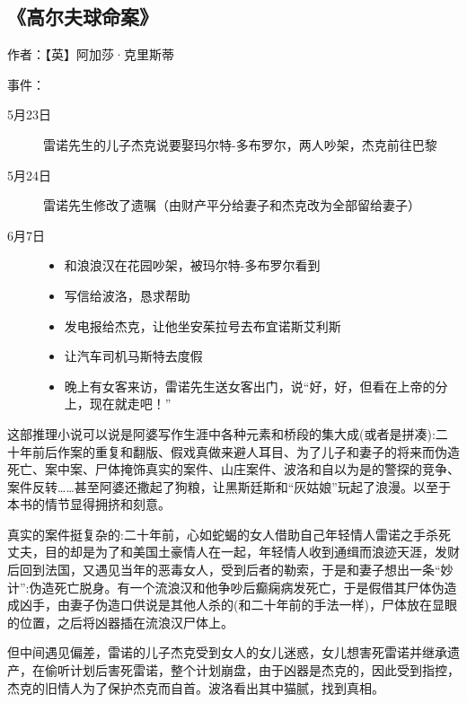 \subsection{《高尔夫球命案》}

作者：【英】阿加莎·克里斯蒂

事件：
\begin{description}
    \item[5月23日]	雷诺先生的儿子杰克说要娶玛尔特-多布罗尔，两人吵架，杰克前往巴黎
    \item[5月24日]	雷诺先生修改了遗嘱（由财产平分给妻子和杰克改为全部留给妻子）
    \item[6月7日]	
    \begin{itemize}
        \item 和浪浪汉在花园吵架，被玛尔特-多布罗尔看到
	    \item 写信给波洛，恳求帮助
	    \item 发电报给杰克，让他坐安茱拉号去布宜诺斯艾利斯
	    \item 让汽车司机马斯特去度假
	    \item 晚上有女客来访，雷诺先生送女客出门，说“好，好，但看在上帝的分上，现在就走吧！”
    \end{itemize}
\end{description}
	

这部推理小说可以说是阿婆写作生涯中各种元素和桥段的集大成(或者是拼凑):二十年前后作案的重复和翻版、假戏真做来避人耳目、为了儿子和妻子的将来而伪造死亡、案中案、尸体掩饰真实的案件、山庄案件、波洛和自以为是的警探的竞争、案件反转……甚至阿婆还撒起了狗粮，让黑斯廷斯和“灰姑娘”玩起了浪漫。以至于本书的情节显得拥挤和刻意。

真实的案件挺复杂的:二十年前，心如蛇蝎的女人借助自己年轻情人雷诺之手杀死丈夫，目的却是为了和美国土豪情人在一起，年轻情人收到通缉而浪迹天涯，发财后回到法国，又遇见当年的恶毒女人，受到后者的勒索，于是和妻子想出一条“妙计”:伪造死亡脱身。有一个流浪汉和他争吵后癫痫病发死亡，于是假借其尸体伪造成凶手，由妻子伪造口供说是其他人杀的(和二十年前的手法一样)，尸体放在显眼的位置，之后将凶器插在流浪汉尸体上。

但中间遇见偏差，雷诺的儿子杰克受到女人的女儿迷惑，女儿想害死雷诺并继承遗产，在偷听计划后害死雷诺，整个计划崩盘，由于凶器是杰克的，因此受到指控，杰克的旧情人为了保护杰克而自首。波洛看出其中猫腻，找到真相。
